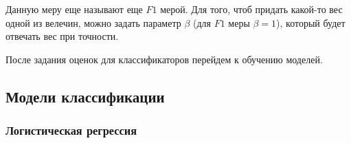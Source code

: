 \documentclass[11pt]{article}
\begin{document}
    Данную меру еще называют еще \(F1\) мерой. Для того, чтоб придать
какой-то вес одной из велечин, можно задать параметр \(\beta\) (для
\(F1\) меры \(\beta=1\)), который будет отвечать вес при точности.

    После задания оценок для классификаторов перейдем к обучению моделей.

    \subsection{Модели
классификации}\label{ux43cux43eux434ux435ux43bux438-ux43aux43bux430ux441ux441ux438ux444ux438ux43aux430ux446ux438ux438}

    \subsubsection{Логистическая
регрессия}\label{ux43bux43eux433ux438ux441ux442ux438ux447ux435ux441ux43aux430ux44f-ux440ux435ux433ux440ux435ux441ux441ux438ux44f}
\end{document}
